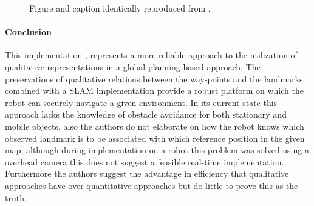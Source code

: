 	\begin{figure}[h!]%
		\centering
		\qquad
		\caption{Figure and caption identically reproduced from \cite{shah2013qualitative}.}
		\label{fig:hand drawn map}%
	\end{figure}
	\paragraph{Conclusion} This implementation \cite{shah2011robust}, represents a more reliable approach to the utilization of qualitative representations in a global planning based approach. The preservations of qualitative relations between the way-points and the landmarks combined with a SLAM implementation provide a robust platform on which the robot can securely navigate a given environment. In its current state this approach lacks the knowledge of obstacle avoidance for both stationary and mobile objects, also the authors do not elaborate on how the robot knows which observed landmark is to be associated with which reference position in the given map, although during implementation on a robot this problem was solved using a overhead camera this does not suggest a feasible real-time implementation. Furthermore the authors suggest the advantage in efficiency that qualitative approaches have over quantitative approaches but do little to prove this as the truth.
	

